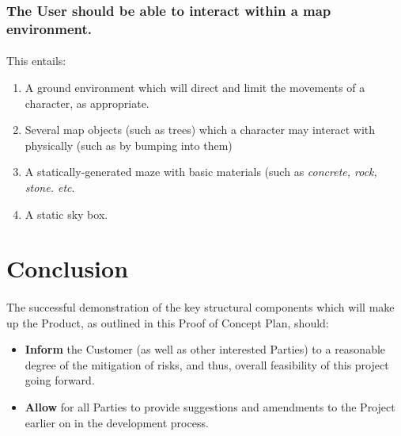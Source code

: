 \documentclass{article}
\begin{document}
\subsubsection{\textbf{The User should be able to interact within a map environment.}}
\paragraph{}This entails:

\begin{enumerate}
  \item A ground environment which will direct and limit the movements of a character, as appropriate.
  \item Several map objects (such as trees) which a character may interact with physically (such as by bumping into them)
  \item A statically-generated maze with basic materials (such as \textit{concrete, rock, stone. etc}.
  \item A static sky box.
\end{enumerate}

\section{Conclusion}
\paragraph{}The successful demonstration of the key structural components which will make up the Product, as outlined in this Proof of Concept Plan, should:
\begin{itemize}
    \item \textbf{Inform} the Customer (as well as other interested Parties) to a reasonable degree of the mitigation of risks, and thus, overall feasibility of this project going forward.
    \item \textbf{Allow} for all Parties to provide suggestions and amendments to the Project earlier on in the development process.
\end{itemize}
\end{document}
